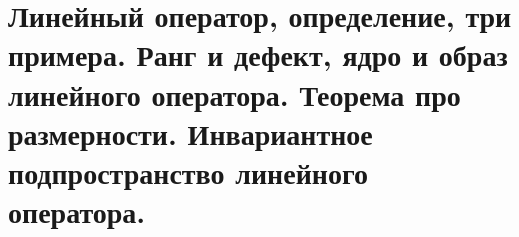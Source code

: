 \section{
    Линейный оператор, определение, три примера. Ранг и дефект, ядро и образ линейного оператора. Теорема про размерности. Инвариантное подпространство линейного оператора.  
}




\newpage





\newpage



